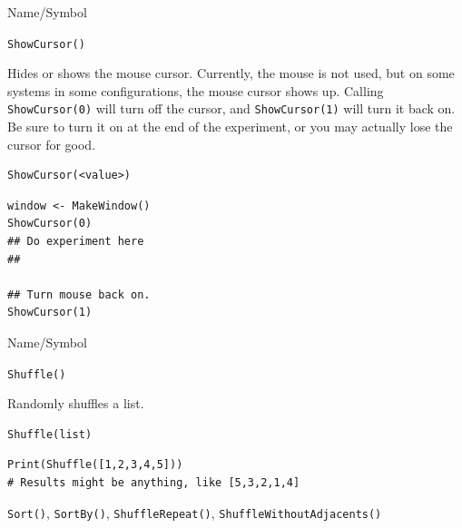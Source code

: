 \begin{desc}{Name/Symbol}
\item[Name/Symbol]  	\verb+ShowCursor()+

\item[Description] Hides or shows the mouse cursor.  Currently, the
  mouse is not used, but on some systems in some configurations, the
  mouse cursor shows up.  Calling \verb+ShowCursor(0)+ will turn off the
  cursor, and \verb+ShowCursor(1)+ will turn it back on.  Be sure to turn it
  on at the end of the experiment, or you may actually lose the cursor
  for good.

\item[Usage]
\begin{verbatim}
ShowCursor(<value>)
\end{verbatim}

\item[Example]
\begin{verbatim}
window <- MakeWindow()
ShowCursor(0)
## Do experiment here
##

## Turn mouse back on.
ShowCursor(1)
\end{verbatim}
\item[See Also] 
\end{desc}



\begin{desc}{Name/Symbol}
\item[Name/Symbol] 	\verb+Shuffle()+

\item[Description] 	Randomly shuffles a list.

\item[Usage]    
\begin{verbatim}
Shuffle(list)
\end{verbatim}

\item[Example]
\begin{verbatim}
Print(Shuffle([1,2,3,4,5]))
# Results might be anything, like [5,3,2,1,4]
\end{verbatim}

\item[See Also]    	\verb+Sort()+, \verb+SortBy()+, \verb+ShuffleRepeat()+,
                    \verb+ShuffleWithoutAdjacents()+
\end{desc}



